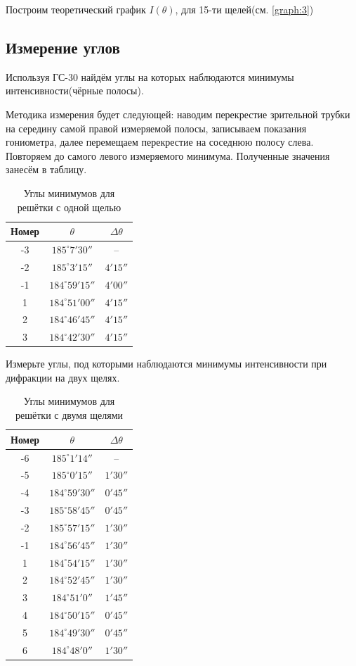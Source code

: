 Построим теоретический график $I(\theta)$, для 15-ти щелей(см. \cref{graph:3})

\subsection{Измерение углов}

Используя ГС-30 найдём углы на которых наблюдаются минимумы интенсивности(чёрные полосы). 

Методика измерения будет следующей: наводим перекрестие зрительной трубки на середину самой правой измеряемой полосы, записываем показания гониометра, далее перемещаем перекрестие на соседнюю полосу слева. Повторяем до самого левого измеряемого минимума. Полученные значения занесём в таблицу.

\begin{table}[H]
	\centering
	\caption{Углы минимумов для решётки с одной щелью}
	\begin{tabular}{ccc}
		\toprule
		Номер & $\theta$ & $\Delta \theta$ \\
		\midrule
		-3 & $ 185^\circ  7' 30''$  & -- \\
		-2 & $ 185^\circ  3' 15''$ & $4' 15''$ \\
		-1 & $ 184^\circ 59' 15''$ & $4' 00''$ \\
		 1 & $ 184^\circ 51' 00''$ & $4' 15''$ \\
		 2 & $ 184^\circ 46' 45''$ & $4' 15''$ \\
		 3 & $ 184^\circ 42' 30''$ & $4' 15''$ \\
		\bottomrule
	\end{tabular}
	\label{tb:4}
\end{table}

Измерьте углы, под которыми наблюдаются минимумы интенсивности при дифракции на двух щелях.
\begin{table}[H]
	\centering
	\caption{Углы минимумов для решётки с двумя щелями}
	\begin{tabular}{ccc}
		\toprule
		Номер & $\theta$ & $\Delta \theta$ \\
		\midrule
		-6 & $185^\circ 1' 14''$  & -- \\
		-5 & $185^\circ 0' 15''$  & $1' 30''$ \\
		-4 & $184^\circ 59' 30''$ & $0' 45''$ \\
		-3 & $185^\circ 58' 45''$ & $0' 45''$ \\
		-2 & $185^\circ 57' 15''$ & $1' 30''$ \\
		-1 & $184^\circ 56' 45''$ & $1' 30''$ \\
		 1 & $184^\circ 54' 15''$ & $1' 30''$ \\
		 2 & $184^\circ 52' 45''$ & $1' 30''$ \\
		 3 & $184^\circ 51' 0''$  & $1' 45''$ \\
		 4 & $184^\circ 50' 15''$ & $0' 45''$ \\
		 5 & $184^\circ 49' 30''$ & $0' 45''$ \\
		 6 & $184^\circ 48' 0''$  & $1' 30''$ \\
		\bottomrule
	\end{tabular}
	\label{tb:5}
\end{table}

